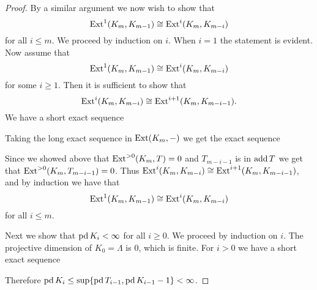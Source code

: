 \begin{theorem}
\begin{proof}
		By a similar argument we now wish to show that $$\operatorname{Ext}^1(K_m, K_{m-1}) \cong \operatorname{Ext}^{i}(K_m, K_{m-i})$$ for all $i \leq m$. We proceed by induction on $i$. When $i=1$ the statement is evident. Now assume that $$\operatorname{Ext}^1(K_m, K_{m-1}) \cong \operatorname{Ext}^{i}(K_m, K_{m-i})$$ for some $i \geq 1$. Then it is sufficient to show that $$ \operatorname{Ext}^{i}(K_m, K_{m-i}) \cong  \operatorname{Ext}^{i+1}(K_m, K_{m-i-1}).$$
		We have a short exact sequence
		\begin{center}
		\end{center}
		Taking the long exact sequence in $\operatorname{Ext}(K_m, -)$ we get the exact sequence
		\begin{center}
		\end{center}
		Since we showed above that $\operatorname{Ext}^{>0}(K_m, T) = 0$ and $T_{m-i-1}$ is in $\operatorname{add} T$ we get that $\operatorname{Ext}^{>0}(K_m, T_{m-i-1}) = 0$. Thus $\operatorname{Ext}^{i}(K_m, K_{m-i}) \cong \operatorname{Ext}^{i+1}(K_m, K_{m-i-1})$, and by induction we have that 
		$$\operatorname{Ext}^1(K_m, K_{m-1}) \cong \operatorname{Ext}^{i}(K_m, K_{m-i})$$ for all $i \leq m$.
		
		Next we show that $\operatorname{pd} K_i < \infty$ for all $i \geq 0$. We proceed by induction on $i$. The projective dimension of $K_0=\Lambda$ is 0, which is finite. For $i>0$ we have a short exact sequence
		\begin{center}
		\end{center}
		Therefore $\operatorname{pd} K_i \leq \sup\{\operatorname{pd} T_{i-1}, \operatorname{pd} K_{i-1} - 1\} < \infty$.
		

\end{proof}
\end{theorem}
